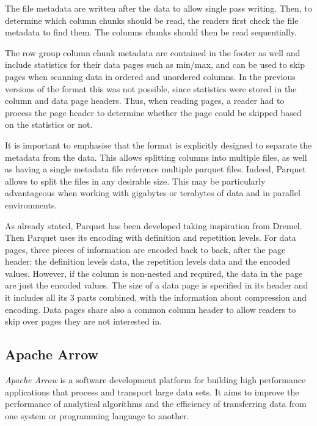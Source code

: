 \documentclass[10pt, a4paper]{report}
\begin{document}
The file metadata are written after the data to allow single pass writing. Then, to determine which column chunks should be read, the readers first check the file metadata to find them. The columns chunks should then be read sequentially.

The row group column chunk metadata are contained in the footer as well and include statistics for their data pages such as min/max, and can be used to skip pages when scanning data in ordered and unordered columns. In the previous versions of the format this was not possible, since statistics were stored in the column and data page headers. Thus, when reading pages, a reader had to process the page header to determine whether the page could be skipped based on the statistics or not.

It is important to emphasise that the format is explicitly designed to separate the metadata from the data. This allows splitting columns into multiple files, as well as having a single metadata file reference multiple parquet files. Indeed, Parquet allows to split the files in any desirable size. This may be particularly advantageous when working with gigabytes or terabytes of data and in parallel environments.

As already stated, Parquet has been developed taking inspiration from Dremel. Then Parquet uses its encoding with definition and repetition levels. For data pages, three pieces of information are encoded back to back, after the page header: the definition levels data, the repetition levels data and the encoded values. However, if the column is non-nested and required, the data in the page are just the encoded values. The size of a data page is specified in its header and it includes all its 3 parts combined, with the information about compression and encoding. Data pages share also a common column header to allow readers to skip over pages they are not interested in.

\subsection{Apache Arrow}

\label{subsection:arrow}

\textit{Apache Arrow} is a software development platform for building high performance applications that process and transport large data sets. It aims to improve the performance of analytical algorithms and the efficiency of transferring data from one system or programming language to another\cite{arrow_overview}.
\end{document}
